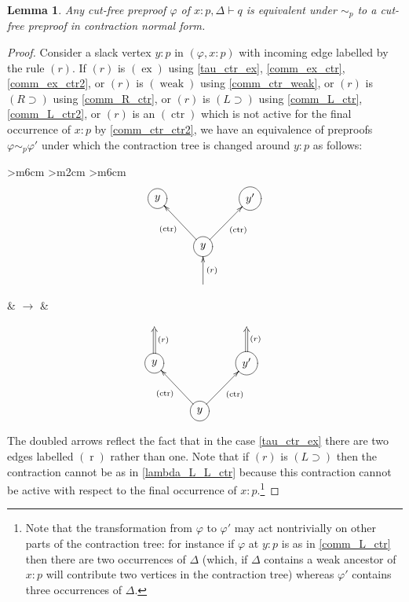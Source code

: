 \documentclass[english,letter paper,12pt,leqno]{article}
\newtheorem{lemma}[theorem]{Lemma}
\theoremstyle{example}
\numberwithin{equation}{section}
\def\imp{\supset}
\begin{document}
\begin{lemma}\label{lemma:contract_normal_form} Any cut-free preproof $\varphi$ of $x:p, \Delta \vdash q$ is equivalent under $\sim_p$ to a cut-free preproof in contraction normal form.
\end{lemma}
\begin{proof}
Consider a slack vertex $y:p$ in $(\varphi, x:p)$ with incoming edge labelled by the rule $(r)$. If $(r)$ is $(\operatorname{ex})$ using \eqref{tau_ctr_ex}, \eqref{comm_ex_ctr},\eqref{comm_ex_ctr2}, or $(r)$ is $(\operatorname{weak})$ using \eqref{comm_ctr_weak}, or $(r)$ is $(R \imp)$ using \eqref{comm_R_ctr}, or $(r)$ is $(L \imp)$ using \eqref{comm_L_ctr}, \eqref{comm_L_ctr2}, or $(r)$ is an $(\operatorname{ctr})$ which is not active for the final occurrence of $x:p$ by \eqref{comm_ctr_ctr2}, we have an equivalence of preproofs $\varphi \sim_p \varphi'$ under which the contraction tree is changed around $y:p$ as follows:
    \begin{center}
    \begin{tabular}{ >{\centering}m{6cm} >{\centering}m{2cm} >{\centering}m{6cm}}
\[
\xymatrix{
*++[o][F]{y} & & *++[o][F]{y'}\\
& *++[o][F]{y}\ar[ul]^-{(\operatorname{ctr})}\ar[ur]_-{(\operatorname{ctr})}\\
& {}\ar[u]_-{(r)}
}
\]
        & $\rightarrow$ &
\[
\xymatrix{
{} & & {}\\
*++[o][F]{y}\ar@{=>}[u]_-{(r)} & & *++[o][F]{y'}\ar@{=>}[u]_-{(r)}\\
& *++[o][F]{y}\ar[ul]^-{(\operatorname{ctr})}\ar[ur]_-{(\operatorname{ctr})}\\
}
\]
    \end{tabular}
    \end{center}
The doubled arrows reflect the fact that in the case \eqref{tau_ctr_ex} there are two edges labelled $(\operatorname{r})$ rather than one. Note that if $(r)$ is $(L \imp)$ then the contraction cannot be as in \eqref{lambda_L_L_ctr} because this contraction cannot be active with respect to the final occurrence of $x:p$.\footnote{Note that the transformation from $\varphi$ to $\varphi'$ may act nontrivially on other parts of the contraction tree: for instance if $\varphi$ at $y:p$ is as in \eqref{comm_L_ctr} then there are two occurrences of $\Delta$ (which, if $\Delta$ contains a weak ancestor of $x:p$ will contribute two vertices in the contraction tree) whereas $\varphi'$ contains three occurrences of $\Delta$.}


\end{proof}
\end{document}
